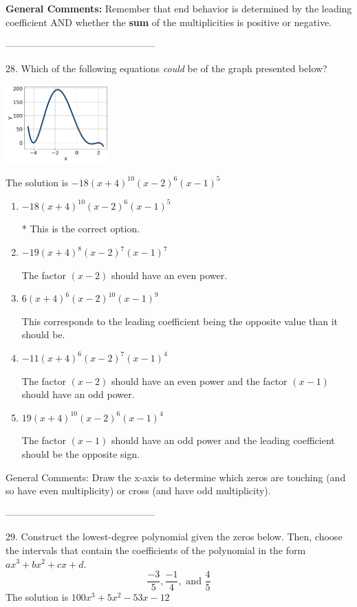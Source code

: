 \documentclass{article}[14pt]
\begin{document}
\textbf{General Comments:} Remember that end behavior is determined by the leading coefficient AND whether the \textbf{sum} of the multiplicities is positive or negative.

-----------------------------------------------

28. Which of the following equations \textit{could} be of the graph presented below?
\begin{center} \includegraphics[width=0.3\textwidth]{../Figures/polyGraphToFunctionC.png} \end{center} 

The solution is $ -18(x + 4)^{10} (x - 2)^{6} (x - 1)^{5} $ 

\begin{enumerate}[label=\Alph*.] 
\item $ -18(x + 4)^{10} (x - 2)^{6} (x - 1)^{5} $ 

 * This is the correct option. 
\item $ -19(x + 4)^{8} (x - 2)^{7} (x - 1)^{7} $ 

 The factor $(x - 2)$ should have an even power. 
\item $ 6(x + 4)^{6} (x - 2)^{10} (x - 1)^{9} $ 

 This corresponds to the leading coefficient being the opposite value than it should be. 
\item $ -11(x + 4)^{6} (x - 2)^{7} (x - 1)^{4} $ 

 The factor $(x - 2)$ should have an even power and the factor $(x - 1)$ should have an odd power. 
\item $ 19(x + 4)^{10} (x - 2)^{6} (x - 1)^{4} $ 

 The factor $(x - 1)$ should have an odd power and the leading coefficient should be the opposite sign. 
\end{enumerate} 
 
General Comments: Draw the x-axis to determine which zeros are touching (and so have even multiplicity) or cross (and have odd multiplicity).

-----------------------------------------------

29. Construct the lowest-degree polynomial given the zeros below. Then, choose the intervals that contain the coefficients of the polynomial in the form $ax^3+bx^2+cx+d$.
$$ \frac{-3}{5}, \frac{-1}{4}, \text{ and } \frac{4}{5} $$ 
The solution is $ 100x^{3} +5 x^{2} -53 x -12 $ 
\end{document}
